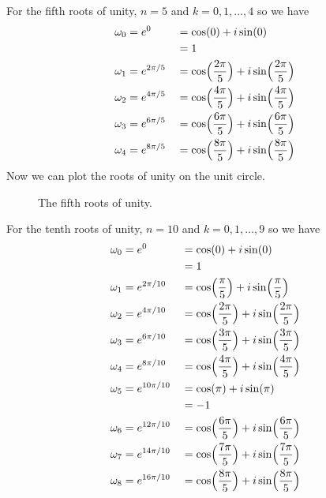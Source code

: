 \begin{enumerate}
  For the fifth roots of unity, \(n = 5\) and \(k = 0,1,\ldots, 4\) so we have
  \begin{alignat*}{2}
    \omega_0 & = e^0 &&{}= \cos(0) + i\sin(0)\\
    & &&{}= 1\\
    \omega_1 & = e^{2\pi/5} &&{}=
    \cos\Bigl(\frac{2\pi}{5}\Bigr) + i\sin\Bigl(\frac{2\pi}{5}\Bigr)\\
    \omega_2 & = e^{4\pi/5} &&{}=
    \cos\Bigl(\frac{4\pi}{5}\Bigr) + i\sin\Bigl(\frac{4\pi}{5}\Bigr)\\
    \omega_3 & = e^{6\pi/5} &&{}=
    \cos\Bigl(\frac{6\pi}{5}\Bigr) + i\sin\Bigl(\frac{6\pi}{5}\Bigr)\\
    \omega_4 & = e^{8\pi/5} &&{}=
    \cos\Bigl(\frac{8\pi}{5}\Bigr) + i\sin\Bigl(\frac{8\pi}{5}\Bigr)\\
  \end{alignat*}
  Now we can plot the roots of unity on the unit circle.
  \begin{figure}[H]
    \centering
    
    \caption{The fifth roots of unity.}
  \end{figure}
  For the tenth roots of unity, \(n = 10\) and \(k = 0,1,\ldots, 9\) so we have
  \begin{alignat*}{2}
    \omega_0 & = e^0 &&{}= \cos(0) + i\sin(0)\\
    & &&{}= 1\\
    \omega_1 & = e^{2\pi/10} &&{}=
    \cos\Bigl(\frac{\pi}{5}\Bigr) + i\sin\Bigl(\frac{\pi}{5}\Bigr)\\
    \omega_2 & = e^{4\pi/10} &&{}=
    \cos\Bigl(\frac{2\pi}{5}\Bigr) + i\sin\Bigl(\frac{2\pi}{5}\Bigr)\\
    \omega_3 & = e^{6\pi/10} &&{}=
    \cos\Bigl(\frac{3\pi}{5}\Bigr) + i\sin\Bigl(\frac{3\pi}{5}\Bigr)\\
    \omega_4 & = e^{8\pi/10} &&{}=
    \cos\Bigl(\frac{4\pi}{5}\Bigr) + i\sin\Bigl(\frac{4\pi}{5}\Bigr)\\
    \omega_5 & = e^{10\pi/10} &&{}= \cos(\pi) + i\sin(\pi)\\
    & &&{}= -1\\
    \omega_6 & = e^{12\pi/10} &&{}=
    \cos\Bigl(\frac{6\pi}{5}\Bigr) + i\sin\Bigl(\frac{6\pi}{5}\Bigr)\\
    \omega_7 & = e^{14\pi/10} &&{}=
    \cos\Bigl(\frac{7\pi}{5}\Bigr) + i\sin\Bigl(\frac{7\pi}{5}\Bigr)\\
    \omega_8 & = e^{16\pi/10} &&{}=
    \cos\Bigl(\frac{8\pi}{5}\Bigr) + i\sin\Bigl(\frac{8\pi}{5}\Bigr)\\

\end{alignat*}
\end{enumerate}
